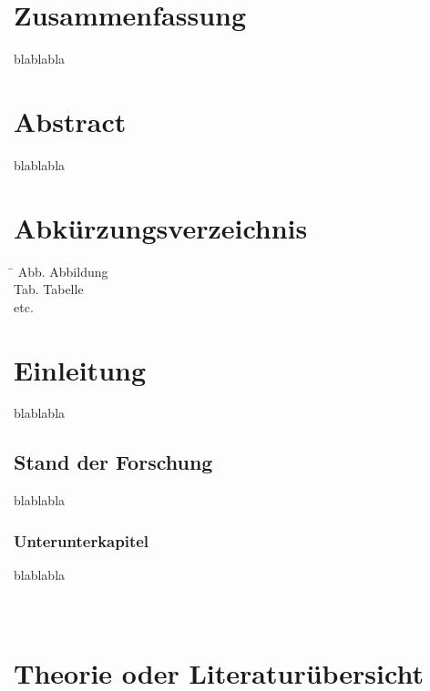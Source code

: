 \documentclass[a4paper,11pt,twoside]{article}
\begin{document}
	
	\newpage
	\section*{Zusammenfassung}
	blablabla
	
	\newpage
	\section*{Abstract}
	blablabla
	
	\newpage
	\section*{Abkürzungsverzeichnis}
	\begin{tabbing}
		\hspace*{3cm} \= \kill
		Abb. \> Abbildung\\
		Tab. \> Tabelle\\
		etc.
	\end{tabbing}
	
	
	\newpage
	\tableofcontents
	\thispagestyle{empty}
	
	
	
	\newpage
	\pagestyle{standard} %
	\section{Einleitung}
	blablabla
	\subsection{Stand der Forschung}
	blablabla
	\subsubsection{Unterunterkapitel}
	blablabla \parencite{gislerProjectWorkResearch2023}
	\\
	\textcite{wust-galleyModelbasedCarbonInventory2020}
	\\
	\textcite{lalCarbonSequestration2008}
	\\ \textcite{BetterBibTeXZotero}
	
	\newpage
	\section{Theorie oder Literaturübersicht}
	
\end{document}
